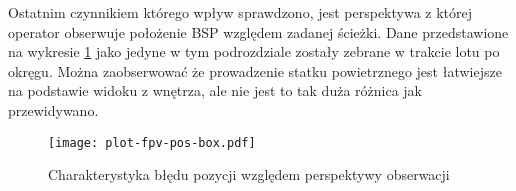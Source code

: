 Ostatnim czynnikiem którego wpływ sprawdzono, jest perspektywa z której operator obserwuje położenie BSP względem zadanej ścieżki. Dane przedstawione na wykresie \ref{fig:plot-fpv-pos-box} jako jedyne w tym podrozdziale zostały zebrane w trakcie lotu po okręgu. Można zaobserwować że prowadzenie statku powietrznego jest łatwiejsze na podstawie widoku z wnętrza, ale nie jest to tak duża różnica jak przewidywano.

\begin{figure}[!h]
    \centering \texttt{[image: plot-fpv-pos-box.pdf]}
    \caption{Charakterystyka błędu pozycji względem perspektywy obserwacji}
    \label{fig:plot-fpv-pos-box}
\end{figure}
